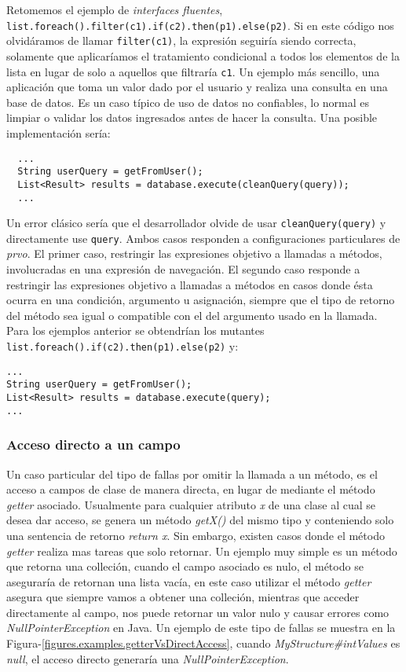 Retomemos el ejemplo de \emph{interfaces fluentes}, \lstinline|list.foreach().filter(c1).if(c2).then(p1).else(p2)|. Si en este c\'odigo nos olvid\'aramos de llamar \texttt{filter(c1)}, la expresi\'on seguir\'ia siendo correcta, solamente que aplicar\'iamos el tratamiento condicional a todos los elementos de la lista en lugar de solo a aquellos que filtrar\'ia \texttt{c1}. Un ejemplo m\'as sencillo, una aplicaci\'on que toma un valor dado por el usuario y realiza una consulta en una base de datos. Es un caso t\'ipico de uso de datos no confiables, lo normal es limpiar o validar los datos ingresados antes de hacer la consulta. Una posible implementaci\'on ser\'ia:
\begin{lstlisting}
  ...
  String userQuery = getFromUser();
  List<Result> results = database.execute(cleanQuery(query));
  ...
\end{lstlisting}
Un error cl\'asico ser\'ia que el desarrollador olvide de usar \texttt{cleanQuery(query)} y directamente use \texttt{query}. Ambos casos responden a configuraciones particulares de \emph{prvo}. El primer caso, restringir las expresiones objetivo a llamadas a m\'etodos, involucradas en una expresi\'on de navegaci\'on. El segundo caso responde a restringir las expresiones objetivo a llamadas a m\'etodos en casos donde \'esta ocurra en una condici\'on, argumento u asignaci\'on, siempre que el tipo de retorno del m\'etodo sea igual o compatible con el del argumento usado en la llamada. Para los ejemplos anterior se obtendr\'ian los mutantes \lstinline|list.foreach().if(c2).then(p1).else(p2)| y:
\begin{lstlisting}
...
String userQuery = getFromUser();
List<Result> results = database.execute(query);
...
\end{lstlisting}

\subsubsection{Acceso directo a un campo}

Un caso particular del tipo de fallas por omitir la llamada a un m\'etodo, es el acceso a campos de clase de manera directa, en lugar de mediante el m\'etodo \emph{getter} asociado. Usualmente para cualquier atributo \emph{x} de una clase al cual se desea dar acceso, se genera un m\'etodo \emph{getX()} del mismo tipo y conteniendo solo una sentencia de retorno \emph{return x}. Sin embargo, existen casos donde el m\'etodo \emph{getter} realiza mas tareas que solo retornar. Un ejemplo muy simple es un m\'etodo que retorna una colleci\'on, cuando el campo asociado es nulo, el m\'etodo se asegurar\'ia de retornan una lista vac\'ia, en este caso utilizar el m\'etodo \emph{getter} asegura que siempre vamos a obtener una colleci\'on, mientras que acceder directamente al campo, nos puede retornar un valor nulo y causar errores como \emph{NullPointerException} en Java. Un ejemplo de este tipo de fallas se muestra en la Figura-\ref{figures.examples.getterVsDirectAccess}, cuando \emph{MyStructure\#intValues} es \emph{null}, el acceso directo generar\'ia una \emph{NullPointerException}.

